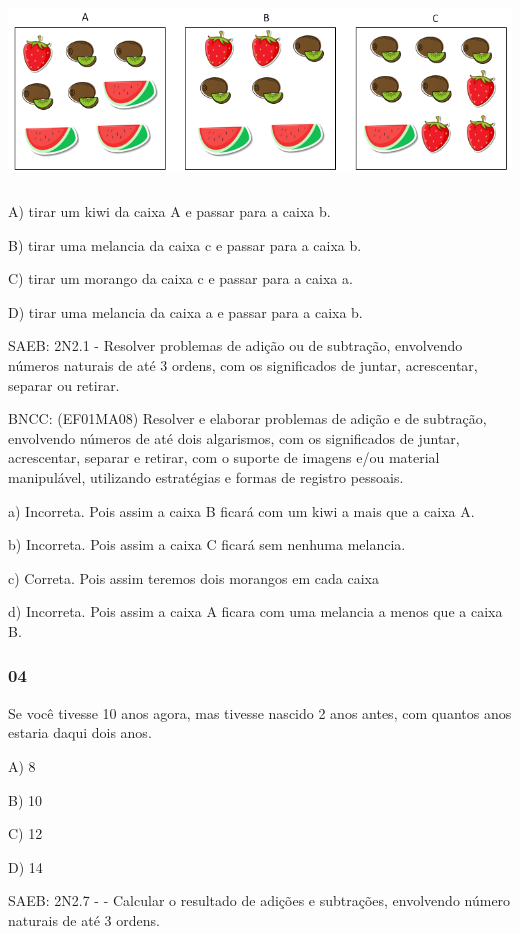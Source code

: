 \includegraphics[width=5.90556in,height=1.93194in]{media/image152.png}

A) tirar um kiwi da caixa A e passar para a caixa b.

B) tirar uma melancia da caixa c e passar para a caixa b.

C) tirar um morango da caixa c e passar para a caixa a.

D) tirar uma melancia da caixa a e passar para a caixa b.

SAEB: 2N2.1 - Resolver problemas de adição ou de subtração, envolvendo
números naturais de até 3 ordens, com os significados de juntar,
acrescentar, separar ou retirar.

BNCC: (EF01MA08) Resolver e elaborar problemas de adição e de subtração,
envolvendo números de até dois algarismos, com os significados de
juntar, acrescentar, separar e retirar, com o suporte de imagens e/ou
material manipulável, utilizando estratégias e formas de registro
pessoais.

a) Incorreta. Pois assim a caixa B ficará com um kiwi a mais que a caixa
A.

b) Incorreta. Pois assim a caixa C ficará sem nenhuma melancia.

c) Correta. Pois assim teremos dois morangos em cada caixa

d) Incorreta. Pois assim a caixa A ficara com uma melancia a menos que a
caixa B.

\subsubsection{04}\label{section-135}

Se você tivesse 10 anos agora, mas tivesse nascido 2 anos antes, com
quantos anos estaria daqui dois anos.

A) 8

B) 10

C) 12

D) 14

SAEB: 2N2.7 - - Calcular o resultado de adições e subtrações, envolvendo
número naturais de até 3 ordens.

